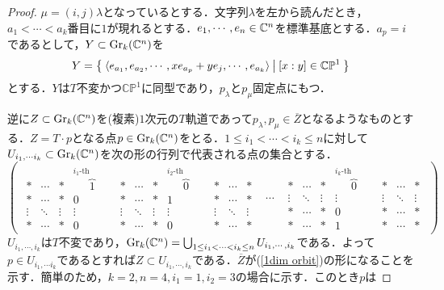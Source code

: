 \begin{proof}
  $\mu = (i,j)\lambda$となっているとする．文字列$\lambda$を左から読んだとき，$a_1<\cdots<a_k$番目に$1$が現れるとする．$e_1,\cdots,e_n\in\mathbb{C}^n$を標準基底とする．$a_p = i$であるとして，$Y\subset \text{Gr}_k(\mathbb{C}^n)$を
  \begin{equation}\label{1dim orbit}
  Y=\left\{\:\langle e_{a_1},e_{a_2},\cdots, xe_{a_p}+ye_j,\cdots,e_{a_k} \rangle\:\middle|\:[x:y]\in\mathbb{CP}^1\:\right\}
  \end{equation}
  とする．$Y$は$T$不変かつ$\mathbb{CP}^1$に同型であり，$p_\lambda$と$p_\mu$固定点にもつ．

  逆に$Z\subset\text{Gr}_k(\mathbb{C}^n)$を(複素)$1$次元の$T$軌道であって$p_\lambda,p_\mu\in\overline{Z}$となるようなものとする．$Z=T\cdot p$となる点$p\in\text{Gr}_k(\mathbb{C}^n)$をとる．$1\leq i_1<\cdots <i_k\leq n$に対して$U_{i_1,\cdots i_k}\subset\text{Gr}_k(\mathbb{C}^n)$を次の形の行列で代表される点の集合とする．
  \begin{equation}\label{chart of grassmannian}
    \left(\begin{array}{ccc}
      {\begin{array}{ccccccccccc}
      * & \cdots & * & \overbrace{1}^{i_1\text{-th column}} & * & \cdots & * & \overbrace{0}^{i_{2}\text{-th column}} & * & \cdots & *\\
      * & \cdots & * & 0 & * & \cdots & * & 1 & * & \cdots & *\\
      \vdots & \ddots & \vdots & \vdots & \vdots & \ddots & \vdots & \vdots & \vdots & \ddots & \vdots\\
      * & \cdots & * & 0 & * & \cdots & * & 0 & * & \cdots & * 
      \end{array}} & \cdots & 
      {\begin{array}{ccccccc}
      * & \cdots & * & \overbrace{0}^{i_{k}\text{-th column}} & * &\cdots & *\\
      \vdots & \ddots & \vdots & \vdots & \vdots & \ddots & \vdots\\
      * & \cdots & * & 0 & * & \cdots & *\\
      * & \cdots & * & 1 & * & \cdots & *
      \end{array}}
    \end{array}\right)
  \end{equation}
  $U_{i_1,\cdots,i_k}$は$T$不変であり，$\text{Gr}_k(\mathbb{C}^n)=\bigcup_{1\leq i_1<\cdots<i_k\leq n}U_{i_1,\cdots,i_k}$である．よって$p\in U_{i_1,\cdots i_k}$であるとすれば$Z\subset U_{i_1,\cdots,i_k}$である．$\overline{Z}$が(\ref{1dim orbit})の形になることを示す．簡単のため，$k=2,n=4,i_1=1,i_2=3$の場合に示す．このとき$p$は

\end{proof}
